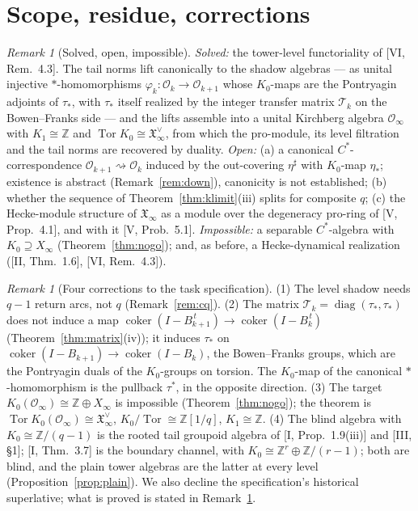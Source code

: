 \documentclass[11pt]{amsart}
\numberwithin{equation}{section}
\theoremstyle{definition}
\theoremstyle{remark}
\newtheorem{remark}[theorem]{Remark}
\newcommand{\Z}{\mathbb{Z}}
\newcommand{\cO}{\mathcal{O}}
\newcommand{\cT}{\mathcal{T}}
\newcommand{\XX}{\mathfrak{X}_\infty}
\newcommand{\coker}{\operatorname{coker}}
\newcommand{\Tor}{\operatorname{Tor}}
\newcommand{\ta}{\tau_*}
\newcommand{\taup}{\tau^*}
\newcommand{\et}{\eta_*}
\newcommand{\shadow}[1]{{#1}^{\sharp}}
\newcommand{\Tdn}{\cT_{k}}
\begin{document}
\section{Scope, residue, corrections}\label{sec:scope}

\begin{remark}[Solved, open, impossible]\label{rem:scope}
\emph{Solved:} the tower-level functoriality of [VI, Rem.~4.3]. The tail norms lift
canonically to the shadow algebras --- as unital injective $*$-homomorphisms
$\varphi_k\colon\cO_k\to\cO_{k+1}$ whose $K_0$-maps are the Pontryagin adjoints of $\ta$,
with $\ta$ itself realized by the integer transfer matrix $\Tdn$ on the Bowen--Franks
side --- and the lifts assemble into a unital Kirchberg algebra $\cO_\infty$ with
$K_1\cong\Z$ and $\Tor K_0\cong\XX^{\vee}$, from which the pro-module, its level
filtration and the tail norms are recovered by duality. \emph{Open:} (a) a canonical
$C^*$-correspondence $\cO_{k+1}\rightsquigarrow\cO_k$ induced by the out-covering
$\shadow\eta$ with $K_0$-map $\et$; existence is abstract (Remark~\ref{rem:down}),
canonicity is not established; (b) whether the sequence of
Theorem~\ref{thm:klimit}(iii) splits for composite $q$; (c) the Hecke-module structure of
$\XX$ as a module over the degeneracy pro-ring of [V, Prop.~4.1], and with it
[V, Prob.~5.1]. \emph{Impossible:} a separable $C^*$-algebra with $K_0\supseteq X_\infty$
(Theorem~\ref{thm:nogo}); and, as before, a Hecke-dynamical realization
([II, Thm.~1.6], [VI, Rem.~4.3]).
\end{remark}

\begin{remark}[Four corrections to the task specification]\label{rem:corrections}
(1) The level shadow needs $q-1$ return arcs, not $q$ (Remark~\ref{rem:cq}). (2) The
matrix $\Tdn=\operatorname{diag}(\ta,\ta)$ does not induce a map
$\coker(I-B_{k+1}^{\,t})\to\coker(I-B_k^{\,t})$ (Theorem~\ref{thm:matrix}(iv)); it induces
$\ta$ on $\coker(I-B_{k+1})\to\coker(I-B_k)$, the Bowen--Franks groups, which are the
Pontryagin duals of the $K_0$-groups on torsion. The $K_0$-map of the canonical
$*$-homomorphism is the pullback $\taup$, in the opposite direction. (3) The target
$K_0(\cO_\infty)\cong\Z\oplus X_\infty$ is impossible (Theorem~\ref{thm:nogo}); the
theorem is $\Tor K_0(\cO_\infty)\cong\XX^{\vee}$, $K_0/\Tor\cong\Z[1/q]$, $K_1\cong\Z$. (4)
The blind algebra with $K_0\cong\Z/(q-1)$ is the rooted tail groupoid algebra of
[I, Prop.~1.9(iii)] and [III, \S1]; [I, Thm.~3.7] is the boundary channel, with
$K_0\cong\Z^r\oplus\Z/(r-1)$; both are blind, and the plain tower algebras are the latter
at every level (Proposition~\ref{prop:plain}). We also decline the specification's
historical superlative; what is proved is stated in Remark~\ref{rem:scope}.
\end{remark}
\end{document}
